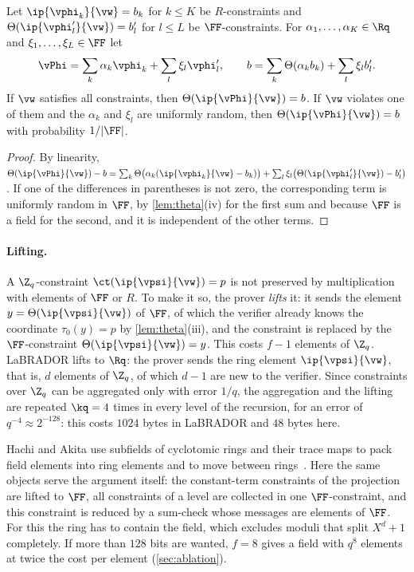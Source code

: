 \begin{lemma}[aggregation]\label{lem:agg}
Let $\ip{\vphi_k}{\vw}=b_k$ for $k\le K$ be $R$-constraints and $\Theta(\ip{\vphi'_l}{\vw})=b'_l$ for $l\le L$ be $\FF$-constraints. For $\alpha_1,\dots,\alpha_K\in\Rq$ and $\xi_1,\dots,\xi_L\in\FF$ let
\[
\vPhi=\sum_k\alpha_k\vphi_k+\sum_l\xi_l\vphi'_l,\qquad b=\sum_k\Theta(\alpha_kb_k)+\sum_l\xi_lb'_l .
\]
If $\vw$ satisfies all constraints, then $\Theta(\ip{\vPhi}{\vw})=b$. If $\vw$ violates one of them and the $\alpha_k$ and $\xi_l$ are uniformly random, then $\Theta(\ip{\vPhi}{\vw})=b$ with probability $1/\lvert\FF\rvert$.
\end{lemma}
\begin{proof}
By linearity, $\Theta(\ip{\vPhi}{\vw})-b=\sum_k\Theta\bigl(\alpha_k(\ip{\vphi_k}{\vw}-b_k)\bigr)+\sum_l\xi_l\bigl(\Theta(\ip{\vphi'_l}{\vw})-b'_l\bigr)$. If one of the differences in parentheses is not zero, the corresponding term is uniformly random in $\FF$, by \cref{lem:theta}(iv) for the first sum and because $\FF$ is a field for the second, and it is independent of the other terms.
\end{proof}

\paragraph{Lifting.}
A $\Z_q$-constraint $\ct(\ip{\vpsi}{\vw})=p$ is not preserved by multiplication with elements of $\FF$ or $R$. To make it so, the prover \emph{lifts} it: it sends the element $y=\Theta(\ip{\vpsi}{\vw})$ of $\FF$, of which the verifier already knows the coordinate $\tau_0(y)=p$ by \cref{lem:theta}(iii), and the constraint is replaced by the $\FF$-constraint $\Theta(\ip{\vpsi}{\vw})=y$. This costs $f-1$ elements of $\Z_q$. LaBRADOR lifts to $\Rq$: the prover sends the ring element $\ip{\vpsi}{\vw}$, that is, $d$ elements of $\Z_q$, of which $d-1$ are new to the verifier. Since constraints over $\Z_q$ can be aggregated only with error $1/q$, the aggregation and the lifting are repeated $\kq=4$ times in every level of the recursion, for an error of $q^{-4}\approx2^{-128}$: this costs $1024$ bytes in LaBRADOR and $48$ bytes here.

\begin{remark}\label{rem:field}
Hachi and Akita use subfields of cyclotomic rings and their trace maps to pack field elements into ring elements and to move between rings~\cite{NOZ26,DBK26}. Here the same objects serve the argument itself: the constant-term constraints of the projection are lifted to $\FF$, all constraints of a level are collected in one $\FF$-constraint, and this constraint is reduced by a sum-check whose messages are elements of $\FF$. For this the ring has to contain the field, which excludes moduli that split $X^d+1$ completely. If more than $128$ bits are wanted, $f=8$ gives a field with $q^8$ elements at twice the cost per element (\cref{sec:ablation}).
\end{remark}
